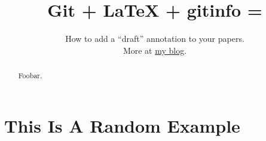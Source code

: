 \documentclass{imports/sig-alternate}
\begin{document}
\title{Git + LaTeX + gitinfo = {\Huge \Heart}}
\subtitle{How to add a ``draft'' annotation to your papers. \\
More at \href{https://balist.es/blog/2016/11/02/git-latex-gitinfo-draft-watermark/}{my blog}.}

\author{
	\iftoggle{isDraft}{Cristian Consonni}{Blind submission}
}

\maketitle

\begin{abstract}

Foobar.

\end{abstract}

\section{This Is A Random Example}

\blindmathpaper
\end{document}
